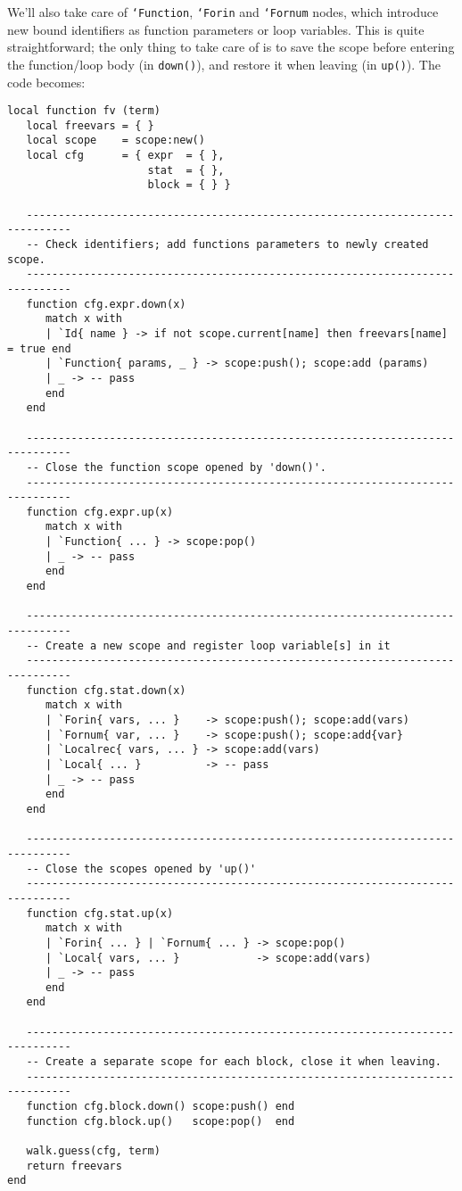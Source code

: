 We'll also take care of {\tt`Function}, {\tt`Forin} and {\tt`Fornum} nodes,
which introduce new bound identifiers as function parameters or loop variables.
This is quite straightforward; the only thing to take care of is to save the
scope before entering the function/loop body (in {\tt down()}), and restore it
when leaving (in {\tt up()}). The code becomes:

  
\begin{Verbatim}[fontsize=\scriptsize]
local function fv (term)
   local freevars = { }
   local scope    = scope:new()
   local cfg      = { expr  = { },
                      stat  = { },
                      block = { } }

   -----------------------------------------------------------------------------
   -- Check identifiers; add functions parameters to newly created scope.
   -----------------------------------------------------------------------------
   function cfg.expr.down(x)
      match x with
      | `Id{ name } -> if not scope.current[name] then freevars[name] = true end
      | `Function{ params, _ } -> scope:push(); scope:add (params)
      | _ -> -- pass
      end
   end

   -----------------------------------------------------------------------------
   -- Close the function scope opened by 'down()'.
   -----------------------------------------------------------------------------
   function cfg.expr.up(x)  
      match x with
      | `Function{ ... } -> scope:pop()
      | _ -> -- pass
      end
   end

   -----------------------------------------------------------------------------
   -- Create a new scope and register loop variable[s] in it
   -----------------------------------------------------------------------------
   function cfg.stat.down(x)
      match x with
      | `Forin{ vars, ... }    -> scope:push(); scope:add(vars)
      | `Fornum{ var, ... }    -> scope:push(); scope:add{var}
      | `Localrec{ vars, ... } -> scope:add(vars)
      | `Local{ ... }          -> -- pass
      | _ -> -- pass
      end
   end

   -----------------------------------------------------------------------------
   -- Close the scopes opened by 'up()'
   -----------------------------------------------------------------------------
   function cfg.stat.up(x)
      match x with
      | `Forin{ ... } | `Fornum{ ... } -> scope:pop()
      | `Local{ vars, ... }            -> scope:add(vars)
      | _ -> -- pass
      end
   end

   -----------------------------------------------------------------------------
   -- Create a separate scope for each block, close it when leaving.
   -----------------------------------------------------------------------------
   function cfg.block.down() scope:push() end
   function cfg.block.up()   scope:pop()  end

   walk.guess(cfg, term)
   return freevars
end
\end{Verbatim}

